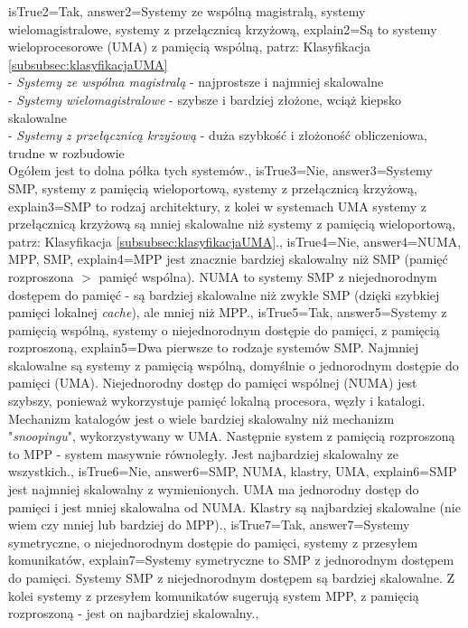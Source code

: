 \begin{enumerate}
\begin{minipage}{\textwidth}
{		isTrue2={Tak},%
		answer2={Systemy ze wspólną magistralą, systemy wielomagistralowe, systemy z przełącznicą krzyżową},%
		explain2={Są to systemy wieloprocesorowe (UMA) z pamięcią wspólną, patrz: Klasyfikacja  \ref{subsubsec:klasyfikacjaUMA}\\
			- \emph{Systemy ze wspólna magistralą} - najprostsze i najmniej skalowalne\\
			- \emph{Systemy wielomagistralowe} - szybsze i bardziej złożone, wciąż kiepsko skalowalne\\
			- \emph{Systemy z przełącznicą krzyżową} - duża szybkość i złożoność obliczeniowa, trudne w rozbudowie\\
			Ogółem jest to dolna półka tych systemów.},%
		isTrue3={Nie},%
		answer3={Systemy SMP, systemy z pamięcią wieloportową, systemy z przełącznicą krzyżową},%
		explain3={SMP to rodzaj architektury, z kolei w systemach UMA systemy z przełącznicą krzyżową są mniej skalowalne niż systemy z pamięcią wieloportową, patrz: Klasyfikacja  \ref{subsubsec:klasyfikacjaUMA}.},%
		isTrue4={Nie},%
		answer4={NUMA, MPP, SMP},%
		explain4={MPP jest znacznie bardziej skalowalny niż SMP (pamięć rozproszona $ > $ pamięć wspólna). NUMA to systemy SMP z niejednorodnym dostępem do pamięć - są bardziej skalowalne niż zwykłe SMP (dzięki szybkiej pamięci lokalnej \emph{cache}), ale mniej niż MPP.},%
		isTrue5={Tak},%
		answer5={Systemy z pamięcią wspólną, systemy o niejednorodnym dostępie do pamięci, z pamięcią rozproszoną}, %
		explain5={Dwa pierwsze to rodzaje systemów SMP. Najmniej skalowalne są systemy z pamięcią wspólną, domyślnie o jednorodnym dostępie do pamięci (UMA). Niejednorodny dostęp do pamięci wspólnej (NUMA) jest szybszy, ponieważ wykorzystuje pamięć lokalną procesora, węzły i katalogi. Mechanizm katalogów jest o wiele bardziej skalowalny niż mechanizm "\emph{snoopingu}", wykorzystywany w UMA. Następnie system z pamięcią rozproszoną to MPP - system masywnie równoległy. Jest najbardziej skalowalny ze wszystkich.}, %
		isTrue6={Nie}, %
		answer6={SMP, NUMA, klastry, UMA}, %
		explain6={SMP jest najmniej skalowalny z wymienionych. UMA ma jednorodny dostęp do pamięci i jest mniej skalowalna od NUMA. Klastry są najbardziej skalowalne (nie wiem czy mniej lub bardziej do MPP).}, %
		isTrue7={Tak}, %
		answer7={Systemy symetryczne, o niejednorodnym dostępie do pamięci, systemy z przesyłem komunikatów}, %
		explain7={Systemy symetryczne to SMP z jednorodnym dostępem do pamięci. Systemy SMP z niejednorodnym dostępem są bardziej skalowalne. Z kolei systemy z przesyłem komunikatów sugerują system MPP, z pamięcią rozproszoną - jest on najbardziej skalowalny.}, %
}
\end{minipage}
\end{enumerate}
